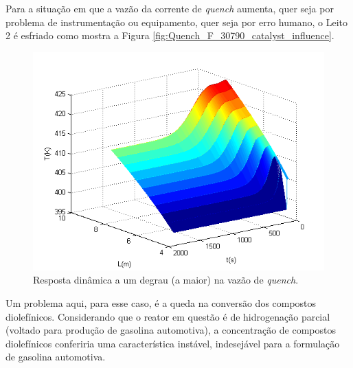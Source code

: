 Para a situação em que a vazão da corrente de \emph{quench} aumenta, quer seja
por problema de instrumentação ou equipamento, quer seja por erro humano, o
Leito 2 é esfriado como mostra a Figura \autoref{fig:Quench_F_30790_catalyst_influence}.

\begin{figure}[htb]
\centering
\includegraphics[scale=0.8]{images/Chap4/Quench_F_30790_catalyst_influence.png}
\caption{Resposta dinâmica a um degrau (a maior) na vazão de \emph{quench}.}
\label{fig:Quench_F_30790_catalyst_influence}
\end{figure}

Um problema aqui, para esse caso, é a queda na conversão dos
compostos diolefínicos. Considerando que o reator em questão é de hidrogenação
parcial (voltado para produção de gasolina automotiva), a concentração de
compostos diolefínicos conferiria uma característica instável, indesejável para
a formulação de gasolina automotiva.
